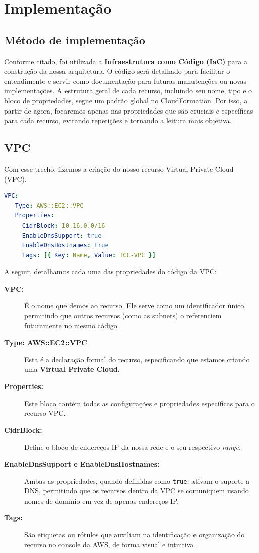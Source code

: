 \chapter{Implementação}

\section{Método de implementação}
Conforme citado, foi utilizada a \textbf{Infraestrutura como Código (IaC)} para a construção da nossa arquitetura. O código será detalhado para facilitar o entendimento e servir como documentação para futuras manutenções ou novas implementações. A estrutura geral de cada recurso, incluindo seu nome, tipo e o bloco de propriedades, segue um padrão global no CloudFormation. Por isso, a partir de agora, focaremos apenas nas propriedades que são cruciais e específicas para cada recurso, evitando repetições e tornando a leitura mais objetiva.

\section{VPC}
Com esse trecho, fizemos a criação do nosso recurso Virtual Private Cloud (VPC).
\begin{lstlisting}[language=yaml, float=htbp,]
 VPC:
   Type: AWS::EC2::VPC
   Properties:
     CidrBlock: 10.16.0.0/16
     EnableDnsSupport: true
     EnableDnsHostnames: true
     Tags: [{ Key: Name, Value: TCC-VPC }]
\end{lstlisting}

A seguir, detalhamos cada uma das propriedades do código da VPC:
\begin{description}
    \item[\textbf{VPC:}] É o nome que demos ao recurso. Ele serve como um identificador único, permitindo que outros recursos (como as subnets) o referenciem futuramente no mesmo código.
    \item[\textbf{Type: AWS::EC2::VPC}] Esta é a declaração formal do recurso, especificando que estamos criando uma \textbf{Virtual Private Cloud}.
    \item[\textbf{Properties:}] Este bloco contém todas as configurações e propriedades específicas para o recurso VPC.
    \item[\textbf{CidrBlock:}] Define o bloco de endereços IP da nossa rede e o seu respectivo \textit{range}.
    \item[\textbf{EnableDnsSupport e EnableDnsHostnames:}] Ambas as propriedades, quando definidas como \texttt{true}, ativam o suporte a DNS, permitindo que os recursos dentro da VPC se comuniquem usando nomes de domínio em vez de apenas endereços IP.
    \item[\textbf{Tags:}] São etiquetas ou rótulos que auxiliam na identificação e organização do recurso no console da AWS, de forma visual e intuitiva.
\end{description}
